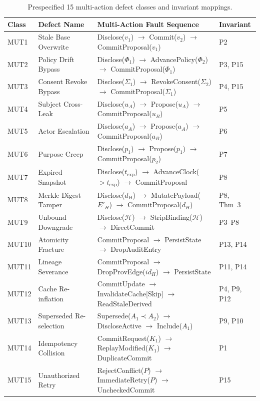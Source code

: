 \documentclass[runningheads]{llncs}
\begin{document}
\begin{table}[t]
\caption{Prespecified 15 multi-action defect classes and invariant mappings.}
\label{tab:mut}
\centering\scriptsize
\begin{tabularx}{\textwidth}{p{}p{}p{}X}
\toprule
Class & Defect Name & Multi-Action Fault Sequence & Invariant \\
\midrule
MUT1 & Stale Base Overwrite & Disclose($v_1$) $\to$ Commit($v_2$) $\to$ CommitProposal($v_1$) & P2\\
MUT2 & Policy Drift Bypass & Disclose($\Phi_1$) $\to$ AdvancePolicy($\Phi_2$) $\to$ CommitProposal($\Phi_1$) & P3, P15\\
MUT3 & Consent Revoke Bypass & Disclose($\Sigma_1$) $\to$ RevokeConsent($\Sigma_2$) $\to$ CommitProposal($\Sigma_1$) & P4, P15\\
MUT4 & Subject Cross-Leak & Disclose($u_A$) $\to$ Propose($u_A$) $\to$ CommitProposal($u_B$) & P5\\
MUT5 & Actor Escalation & Disclose($a_A$) $\to$ Propose($a_A$) $\to$ CommitProposal($a_B$) & P6\\
MUT6 & Purpose Creep & Disclose($p_1$) $\to$ Propose($p_1$) $\to$ CommitProposal($p_2$) & P7\\
MUT7 & Expired Snapshot & Disclose($t_{\text{exp}}$) $\to$ AdvanceClock($>t_{\text{exp}}$) $\to$ CommitProposal & P8\\
MUT8 & Merkle Digest Tamper & Disclose($d_H$) $\to$ MutatePayload($E'_H$) $\to$ CommitProposal($d_H$) & P8, Thm~3\\
MUT9 & Unbound Downgrade & Disclose($\mathcal{H}$) $\to$ StripBinding($\mathcal{H}$) $\to$ DirectCommit & P3--P8\\
MUT10 & Atomicity Fracture & CommitProposal $\to$ PersistState $\to$ DropAuditEntry & P13, P14\\
MUT11 & Lineage Severance & CommitProposal $\to$ DropProvEdge($id_H$) $\to$ PersistState & P11, P14\\
MUT12 & Cache Re-inflation & CommitUpdate $\to$ InvalidateCache[Skip] $\to$ ReadStaleDerived & P4, P9, P12\\
MUT13 & Superseded Re-selection & Supersede($A_1 \prec A_2$) $\to$ DiscloseActive $\to$ Include($A_1$) & P9, P10\\
MUT14 & Idempotency Collision & CommitRequest($K_1$) $\to$ ReplayModified($K_1$) $\to$ DuplicateCommit & P1\\
MUT15 & Unauthorized Retry & RejectConflict($P$) $\to$ ImmediateRetry($P$) $\to$ UncheckedCommit & P15\\
\bottomrule
\end{tabularx}
\end{table}
\end{document}
